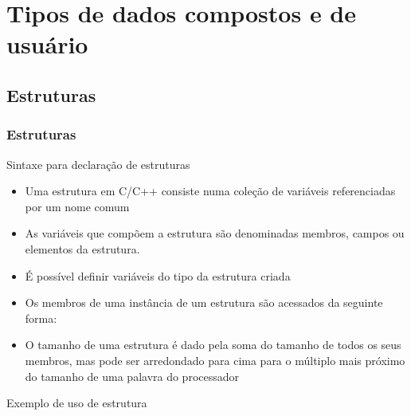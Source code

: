 \section{Tipos de dados compostos e de usuário}

\subsection{Estruturas}

\begin{frame}[fragile]

	\frametitle{Estruturas}

    \begin{block}{Sintaxe para declaração de estruturas}
    \end{block}

	\begin{itemize}
		\item Uma estrutura em C/C++ consiste numa coleção de variáveis 
		referenciadas por um nome comum

		\item As variáveis que compõem a estrutura são denominadas membros, campos ou elementos
		da estrutura.

		\item É possível definir variáveis do tipo da estrutura criada

		\item Os membros de uma instância de um estrutura são acessados da seguinte forma: 

		\item O tamanho de uma estrutura é dado pela soma do tamanho de todos os seus membros, 
        mas pode ser arredondado para cima para o múltiplo mais próximo do tamanho de uma 
        palavra do processador
	\end{itemize}

\end{frame}

\begin{frame}[fragile]{Exemplo de uso de estrutura}
\end{frame}

